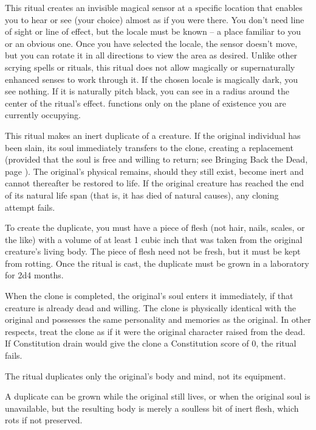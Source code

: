 \spelldur{\durmed \dismissable}
\spelleffect This ritual creates an invisible magical sensor at a specific location that enables you to hear or see (your choice) almost as if you were there. You don't need line of sight or line of effect, but the locale must be known -- a place familiar to you or an obvious one. Once you have selected the locale, the sensor doesn't move, but you can rotate it in all directions to view the area as desired. Unlike other scrying spells or rituals, this ritual does not allow magically or supernaturally enhanced senses to work through it. If the chosen locale is magically dark, you see nothing. If it is naturally pitch black, you can see in a \areasmall radius around the center of the ritual's effect.  functions only on the plane of existence you are currently occupying.

\spelleffect This ritual makes an inert duplicate of a creature. If the original individual has been slain, its soul immediately transfers to the clone, creating a replacement (provided that the soul is free and willing to return; see Bringing Back the Dead, page \pageref{Bringing Back the Dead}). The original's physical remains, should they still exist, become inert and cannot thereafter be restored to life. If the original creature has reached the end of its natural life span (that is, it has died of natural causes), any cloning attempt fails.
\par To create the duplicate, you must have a piece of flesh (not hair, nails, scales, or the like) with a volume of at least 1 cubic inch that was taken from the original creature's living body. The piece of flesh need not be fresh, but it must be kept from rotting. Once the ritual is cast, the duplicate must be grown in a laboratory for 2d4 months.
\par When the clone is completed, the original's soul enters it immediately, if that creature is already dead and willing. The clone is physically identical with the original and possesses the same personality and memories as the original. In other respects, treat the clone as if it were the original character raised from the dead. If Constitution drain would give the clone a Constitution score of 0, the ritual fails.
\spellnotes \par The ritual duplicates only the original's body and mind, not its equipment.
\par A duplicate can be grown while the original still lives, or when the original soul is unavailable, but the resulting body is merely a soulless bit of inert flesh, which rots if not preserved.


